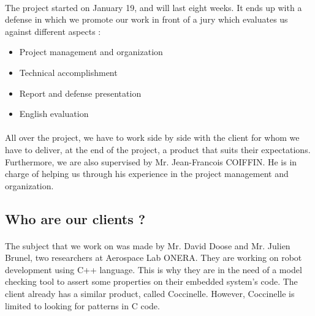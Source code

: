 \documentclass{report}
\begin{document}
\paragraph{}
\hspace{4mm}The project started on January 19, and will last eight weeks. It ends up with 
a defense in which we promote our work in front of a jury which evaluates 
us against different aspects :

\vspace{1.5mm}
\begin{itemize}
\item Project management and organization\vspace{1mm}
\item Technical accomplishment\vspace{1mm}
\item Report and defense presentation\vspace{1mm}
\item English evaluation\vspace{1mm}
\end{itemize}

\paragraph{}
\hspace{4mm}All over the project, we have to work side by side with the client
 for whom we have to deliver, at the end of the project,
 a product that suits their expectations. Furthermore, we are 
also supervised by Mr. Jean-Francois COIFFIN. He is in charge 
of helping us through his experience in the project management and 
organization.

\subsection{Who are our clients ?}

\paragraph{}
\hspace{4mm}The subject that we work on was made by Mr. David Doose and
 Mr. Julien Brunel, two researchers at Aerospace Lab ONERA. They are
 working on robot development using C++ language. This is why they are
 in the need of a model checking tool to assert some properties on their 
embedded system's code. The client already has a similar product, called Coccinelle. 
However, Coccinelle is limited to looking for patterns in C code.
\end{document}
